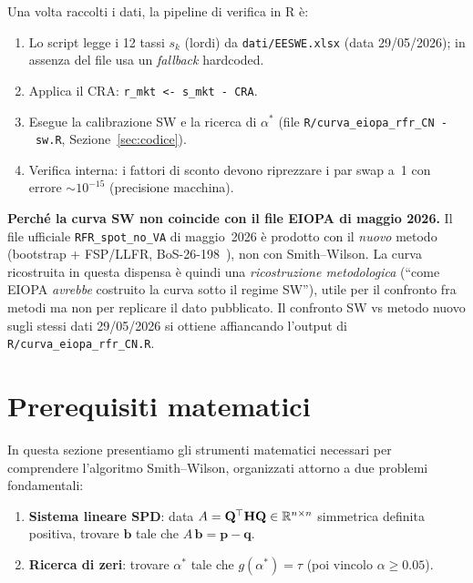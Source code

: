 \documentclass[11pt,a4paper]{article}
\theoremstyle{plain}
\theoremstyle{definition}
\theoremstyle{remark}
\newcommand{\R}{\mathbb{R}}
\newcommand{\bfb}{\mathbf{b}}
\newcommand{\bfp}{\mathbf{p}}
\newcommand{\bfq}{\mathbf{q}}
\newcommand{\Hmat}{\mathbf{H}}
\newcommand{\Qmat}{\mathbf{Q}}
\newcommand{\transp}{^{\mskip-1mu\top}}
\begin{document}
Una volta raccolti i dati, la pipeline di verifica in R \`e:

\begin{enumerate}
  \item Lo script legge i 12 tassi $s_k$ (lordi) da \texttt{dati/EESWE.xlsx}
        (data 29/05/2026); in assenza del file usa un \emph{fallback} hardcoded.
  \item Applica il CRA: \texttt{r\_mkt <- s\_mkt - CRA}.
  \item Esegue la calibrazione SW e la ricerca di $\alpha^*$
        (file \texttt{R/curva\_eiopa\_rfr\_CN\ -\ sw.R}, Sezione~\ref{sec:codice}).
  \item Verifica interna: i fattori di sconto devono riprezzare i par swap a~1
        con errore $\sim 10^{-15}$ (precisione macchina).
\end{enumerate}

\begin{warningbox}
\textbf{Perché la curva SW non coincide con il file EIOPA di maggio 2026.}
Il file ufficiale \texttt{RFR\_spot\_no\_VA} di maggio~2026 è prodotto con il
\emph{nuovo} metodo (bootstrap + FSP/LLFR, BoS-26-198~\cite{eiopa2026}), non con
Smith--Wilson. La curva ricostruita in questa dispensa è quindi una
\emph{ricostruzione metodologica} (``come EIOPA \emph{avrebbe} costruito la curva
sotto il regime SW''), utile per il confronto fra metodi ma non per replicare il
dato pubblicato. Il confronto SW vs metodo nuovo sugli stessi dati 29/05/2026 si
ottiene affiancando l'output di \texttt{R/curva\_eiopa\_rfr\_CN.R}.
\end{warningbox}

\section{Prerequisiti matematici}
\label{sec:prerequisiti}

In questa sezione presentiamo gli strumenti matematici necessari per comprendere
l'algoritmo Smith--Wilson, organizzati attorno a due problemi fondamentali:

\begin{keybox}
\begin{enumerate}
  \item \textbf{Sistema lineare SPD}: data $A=\Qmat\transp\Hmat\Qmat \in \R^{n\times n}$
        simmetrica definita positiva, trovare $\bfb$ tale che $A\,\bfb = \bfp-\bfq$.
  \item \textbf{Ricerca di zeri}: trovare $\alpha^*$ tale che
        $g(\alpha^*) = \tau$ (poi vincolo $\alpha\ge 0.05$).
\end{enumerate}
\end{keybox}
\end{document}
